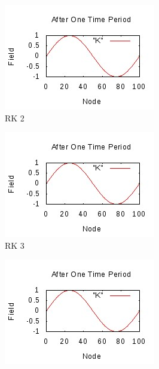 \documentclass[a4paper,12pt]{report}
\begin{document}
\begin{figure}[h!]  
	\centering
	\begin{subfigure}[b]{0.4\textwidth}
		\includegraphics[width=\textwidth]{rk2ctd.jpeg}
                \caption{RK 2}
                \label{fig:rk2ctd}
	\end{subfigure}
	\begin{subfigure}[b]{0.4\textwidth}
		\includegraphics[width=\textwidth]{rk3ctd.jpeg}
                \caption{RK 3}
                \label{fig:rk3ctd}
	\end{subfigure}
	\begin{subfigure}[b]{0.4\textwidth}
		\includegraphics[width=\textwidth]{rk3ctd.jpeg}

\end{subfigure}
\end{figure}
\end{document}
